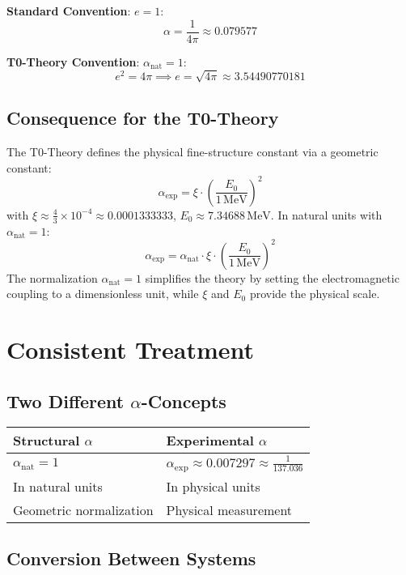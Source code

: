 \documentclass[12pt,a4paper]{article}
\theoremstyle{definition}
\begin{document}
\textbf{Standard Convention}: $e = 1$:
\[
\alpha = \frac{1}{4\pi} \approx 0.079577
\]

\textbf{T0-Theory Convention}: $\alpha_{\text{nat}} = 1$:
\[
e^2 = 4\pi \implies e = \sqrt{4\pi} \approx 3.54490770181
\]

\subsection*{Consequence for the T0-Theory}

The T0-Theory defines the physical fine-structure constant via a geometric constant:
\[
\alpha_{\text{exp}} = \xi \cdot \left(\frac{E_0}{1 \, \text{MeV}}\right)^2
\]
with $\xi \approx \frac{4}{3} \times 10^{-4} \approx 0.0001333333$, $E_0 \approx 7.34688 \, \text{MeV}$. In natural units with $\alpha_{\text{nat}} = 1$:
\[
\alpha_{\text{exp}} = \alpha_{\text{nat}} \cdot \xi \cdot \left(\frac{E_0}{1 \, \text{MeV}}\right)^2
\]
The normalization $\alpha_{\text{nat}} = 1$ simplifies the theory by setting the electromagnetic coupling to a dimensionless unit, while $\xi$ and $E_0$ provide the physical scale.

\section*{Consistent Treatment}

\subsection*{Two Different $\alpha$-Concepts}

\begin{tcolorbox}[colback=blue!5!white,colframe=blue!75!black]
	\begin{tabular}{p{}p{}}
		\textbf{Structural $\alpha$} & \textbf{Experimental $\alpha$} \\
		\hline
		$\alpha_{\text{nat}} = 1$ & $\alpha_{\text{exp}} \approx 0.007297 \approx \frac{1}{137.036}$ \\
		In natural units & In physical units \\
		Geometric normalization & Physical measurement \\
	\end{tabular}
\end{tcolorbox}

\subsection*{Conversion Between Systems}
\end{document}
